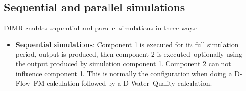 \documentclass[signature]{deltares_manual}
\newcommand{\dwaqfull}{\textrm{D-Water~Quality}\xspace}
\newcommand{\dwaq}{\dwaqfull}
\newcommand{\dflowfm}{\textrm{D-Flow~FM}\xspace}
\newcommand{\dimr}{\textrm{DIMR}\xspace}
\begin{document}
\subsection{Sequential and parallel simulations} 
\label{subsec:SecPrl}
\dimr enables sequential and parallel simulations in three ways:
\begin{itemize}
	\item \textbf{Sequential simulations}: Component 1 is executed for its full simulation period, output is produced, then component 2 is executed, optionally using the output produced by simulation component 1. Component 2 can not influence component 1. This is normally the configuration when doing a \dflowfm calculation followed by a \dwaq calculation.
	

\end{itemize}
\end{document}
